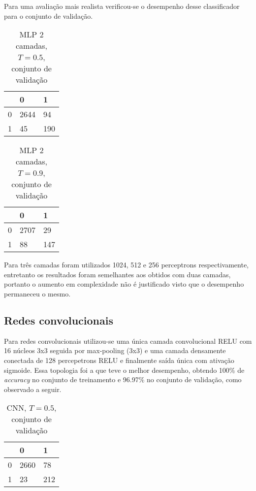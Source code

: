 Para uma avaliação mais realista verificou-se o desempenho desse classificador para o conjunto de validação.
\begin{table}[h!]
\centering
\caption{MLP 2 camadas, $T=0.5$, conjunto de validação}
\begin{tabular}{l|l|l|}
\cline{2-3}
                        & 0 & 1 \\ \hline
\multicolumn{1}{|l|}{0} & 2644 & 94 \\ \hline
\multicolumn{1}{|l|}{1} & 45   & 190 \\ \hline
\end{tabular}
\end{table}

\begin{table}[h!]
\centering
\caption{MLP 2 camadas, $T=0.9$, conjunto de validação}
\begin{tabular}{l|l|l|}
\cline{2-3}
                        & 0 & 1 \\ \hline
\multicolumn{1}{|l|}{0} & 2707 & 29 \\ \hline
\multicolumn{1}{|l|}{1} & 88   & 147 \\ \hline
\end{tabular}
\end{table}

Para três camadas foram utilizados 1024, 512 e 256 perceptrons respectivamente, entretanto os resultados foram semelhantes aos obtidos com duas camadas, portanto o aumento em complexidade não é justificado visto que o desempenho permaneceu o mesmo.

\subsection{Redes convolucionais}
Para redes convolucionais utilizou-se uma única camada convolucional RELU com 16 núcleos 3x3 seguida por max-pooling (3x3) e uma camada densamente conectada de 128 percepetrons RELU e finalmente saída única com ativação sigmoide. Essa topologia foi a que teve o melhor desempenho, obtendo 100\% de \textit{accuracy} no conjunto de treinamento e 96.97\% no conjunto de validação, como observado a seguir.

\begin{table}[h!]
\centering
\caption{CNN, $T=0.5$, conjunto de validação}
\begin{tabular}{l|l|l|}
\cline{2-3}
                        & 0 & 1 \\ \hline
\multicolumn{1}{|l|}{0} & 2660 & 78 \\ \hline
\multicolumn{1}{|l|}{1} & 23   & 212 \\ \hline
\end{tabular}
\end{table}

